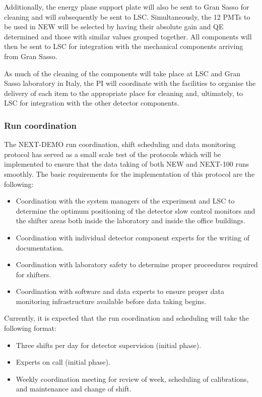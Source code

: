\documentclass[a4paper,11pt,oneside]{article}
\begin{document}
Additionally, the energy plane support plate will also be sent to Gran
Sasso for cleaning and will subsequently be sent to
LSC. Simultaneously, the 12 PMTs to be used in NEW will be selected by
having their absolute gain and QE determined and those with similar
values grouped together. All components will then be sent to LSC for
integration with the mechanical components arriving from Gran Sasso.

As much of the cleaning of the components will take place at LSC and Gran Sasso
laboratory in Italy, the PI will coordinate with the facilities to
organise the delivery of each item to the appropriate place for
cleaning and, ultimately, to LSC for integration with the other
detector components.

\subsubsection*{Run coordination}
The NEXT-DEMO run coordination, shift scheduling and data monitoring
protocol has served as a small scale test of the protocols which will
be implemented to ensure that the data taking of both NEW and NEXT-100
runs smoothly. The basic requirements for the implementation of this
protocol are the following:
\begin{itemize}
\item Coordination with the system managers of the experiment and LSC
  to determine the optimum positioning of the detector slow control
  monitors and the shifter areas both inside the laboratory and inside
  the office buildings.
\item Coordination with individual detector component experts for the
  writing of documentation.
\item Coordination with laboratory safety to determine proper
  proceedures required for shifters.
\item Coordination with software and data experts to ensure proper
  data monitoring infrastructure available before data taking begins.
\end{itemize}
Currently, it is expected that the run coordination and scheduling
will take the following format:
\begin{itemize}
\item Three shifts per day for detector supervision (initial phase).
\item Experts on call (initial phase).
\item Weekly coordination meeting for review of week, scheduling of
  calibrations, and maintenance and change of shift.
\end{itemize}
\end{document}
